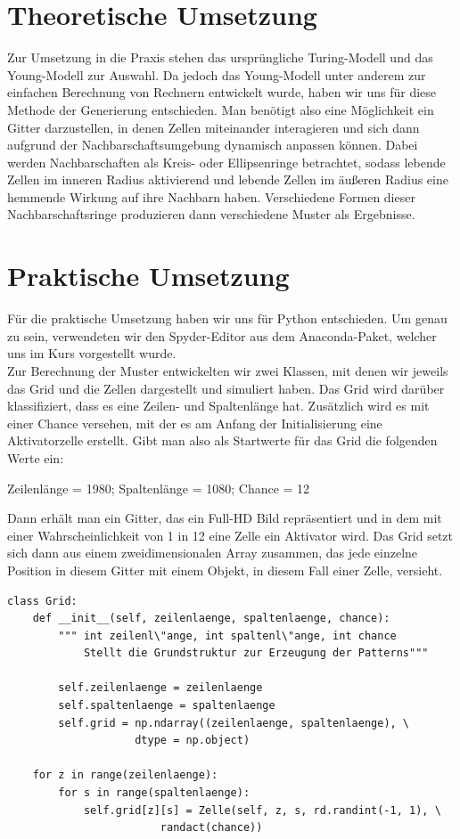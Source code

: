 \documentclass[]{article}
\begin{document}
\section{Theoretische Umsetzung}
Zur Umsetzung in die Praxis stehen das urspr\"ungliche Turing-Modell und das Young-Modell zur Auswahl. 
Da jedoch das Young-Modell unter anderem zur einfachen Berechnung von Rechnern entwickelt wurde, haben wir uns f\"ur diese Methode der Generierung entschieden.
Man ben\"otigt also eine M\"oglichkeit ein Gitter darzustellen, in denen Zellen miteinander interagieren und sich dann aufgrund der Nachbarschaftsumgebung dynamisch anpassen k\"onnen.
Dabei werden Nachbarschaften als Kreis- oder Ellipsenringe betrachtet, sodass lebende Zellen im inneren Radius aktivierend und lebende Zellen im \"au\ss eren Radius eine hemmende Wirkung auf ihre Nachbarn haben. Verschiedene Formen dieser Nachbarschaftsringe produzieren dann verschiedene Muster als Ergebnisse.


\section{Praktische Umsetzung}

F\"ur die praktische Umsetzung haben wir uns f\"ur Python entschieden. Um genau zu sein, verwendeten wir den Spyder-Editor aus dem Anaconda-Paket, welcher uns im Kurs vorgestellt wurde. \\

Zur Berechnung der Muster entwickelten wir zwei Klassen, mit denen wir jeweils das Grid und die Zellen dargestellt und simuliert haben. 
Das Grid wird dar\"uber klassifiziert, dass es eine Zeilen- und Spaltenl\"ange hat. Zus\"atzlich wird es mit einer Chance versehen, mit der es am Anfang der Initialisierung eine Aktivatorzelle erstellt. Gibt man also als Startwerte f\"ur das Grid die folgenden Werte ein:
\begin{center}
	Zeilenl\"ange = 1980; Spaltenl\"ange = 1080; Chance = 12
\end{center}
Dann erh\"alt man ein Gitter, das ein Full-HD Bild repr\"asentiert und in dem mit einer Wahrscheinlichkeit von 1 in 12 eine Zelle ein Aktivator wird.
Das Grid setzt sich dann aus einem zweidimensionalen Array zusammen, das jede einzelne Position in diesem Gitter mit einem Objekt, in diesem Fall einer Zelle, versieht. \\

\begin{lstlisting}
class Grid:
	def __init__(self, zeilenlaenge, spaltenlaenge, chance):
		""" int zeilenl\"ange, int spaltenl\"ange, int chance
			Stellt die Grundstruktur zur Erzeugung der Patterns"""
			
		self.zeilenlaenge = zeilenlaenge
		self.spaltenlaenge = spaltenlaenge
		self.grid = np.ndarray((zeilenlaenge, spaltenlaenge), \
					dtype = np.object)

	for z in range(zeilenlaenge):
		for s in range(spaltenlaenge):
			self.grid[z][s] = Zelle(self, z, s, rd.randint(-1, 1), \
						randact(chance))
\end{lstlisting}
\end{document}
